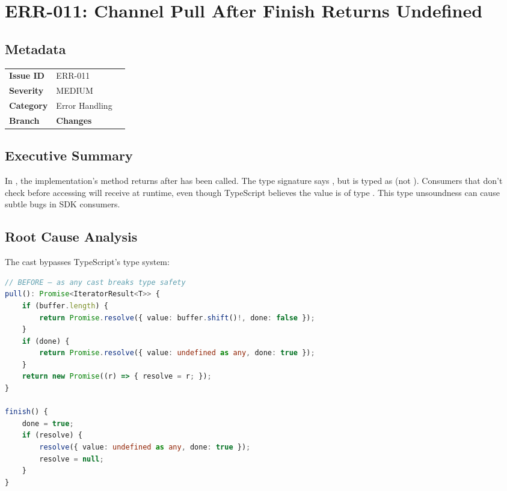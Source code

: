 \section{ERR-011: Channel Pull After Finish Returns Undefined}
\label{sec:err-011}
\subsection*{Metadata}
\begin{tabular}{ll}
\textbf{Issue ID} & ERR-011 \\
\textbf{Severity} & MEDIUM \\
\textbf{Category} & Error Handling \\
\textbf{Branch} & 
\textbf{Changes} &  \\
\end{tabular}

\subsection*{Executive Summary}
In , the  implementation's  method returns  after  has been called. The type signature says , but  is typed as  (not ). Consumers that don't check  before accessing  will receive  at runtime, even though TypeScript believes the value is of type . This type unsoundness can cause subtle bugs in SDK consumers.

\subsection*{Root Cause Analysis}
The  cast bypasses TypeScript's type system:

\begin{lstlisting}[language=TypeScript]
// BEFORE — as any cast breaks type safety
pull(): Promise<IteratorResult<T>> {
    if (buffer.length) {
        return Promise.resolve({ value: buffer.shift()!, done: false });
    }
    if (done) {
        return Promise.resolve({ value: undefined as any, done: true });
    }
    return new Promise((r) => { resolve = r; });
}

finish() {
    done = true;
    if (resolve) {
        resolve({ value: undefined as any, done: true });
        resolve = null;
    }
}
\end{lstlisting}

